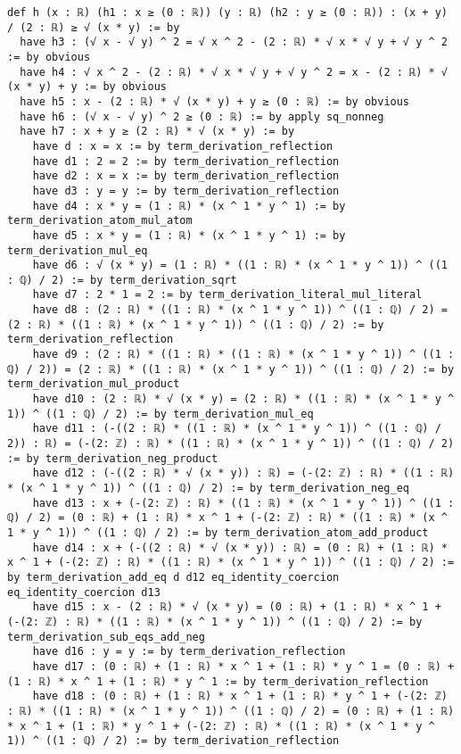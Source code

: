 \documentclass{article}
\begin{document}
\begin{tcolorbox}[colback=white!10, width=\linewidth]
\begin{lstlisting}[language=Lean4]
def h (x : ℝ) (h1 : x ≥ (0 : ℝ)) (y : ℝ) (h2 : y ≥ (0 : ℝ)) : (x + y) / (2 : ℝ) ≥ √ (x * y) := by
  have h3 : (√ x - √ y) ^ 2 = √ x ^ 2 - (2 : ℝ) * √ x * √ y + √ y ^ 2 := by obvious
  have h4 : √ x ^ 2 - (2 : ℝ) * √ x * √ y + √ y ^ 2 = x - (2 : ℝ) * √ (x * y) + y := by obvious
  have h5 : x - (2 : ℝ) * √ (x * y) + y ≥ (0 : ℝ) := by obvious
  have h6 : (√ x - √ y) ^ 2 ≥ (0 : ℝ) := by apply sq_nonneg
  have h7 : x + y ≥ (2 : ℝ) * √ (x * y) := by
    have d : x = x := by term_derivation_reflection
    have d1 : 2 = 2 := by term_derivation_reflection
    have d2 : x = x := by term_derivation_reflection
    have d3 : y = y := by term_derivation_reflection
    have d4 : x * y = (1 : ℝ) * (x ^ 1 * y ^ 1) := by term_derivation_atom_mul_atom
    have d5 : x * y = (1 : ℝ) * (x ^ 1 * y ^ 1) := by term_derivation_mul_eq
    have d6 : √ (x * y) = (1 : ℝ) * ((1 : ℝ) * (x ^ 1 * y ^ 1)) ^ ((1 : ℚ) / 2) := by term_derivation_sqrt
    have d7 : 2 * 1 = 2 := by term_derivation_literal_mul_literal
    have d8 : (2 : ℝ) * ((1 : ℝ) * (x ^ 1 * y ^ 1)) ^ ((1 : ℚ) / 2) = (2 : ℝ) * ((1 : ℝ) * (x ^ 1 * y ^ 1)) ^ ((1 : ℚ) / 2) := by term_derivation_reflection
    have d9 : (2 : ℝ) * ((1 : ℝ) * ((1 : ℝ) * (x ^ 1 * y ^ 1)) ^ ((1 : ℚ) / 2)) = (2 : ℝ) * ((1 : ℝ) * (x ^ 1 * y ^ 1)) ^ ((1 : ℚ) / 2) := by term_derivation_mul_product
    have d10 : (2 : ℝ) * √ (x * y) = (2 : ℝ) * ((1 : ℝ) * (x ^ 1 * y ^ 1)) ^ ((1 : ℚ) / 2) := by term_derivation_mul_eq
    have d11 : (-((2 : ℝ) * ((1 : ℝ) * (x ^ 1 * y ^ 1)) ^ ((1 : ℚ) / 2)) : ℝ) = (-(2: ℤ) : ℝ) * ((1 : ℝ) * (x ^ 1 * y ^ 1)) ^ ((1 : ℚ) / 2) := by term_derivation_neg_product
    have d12 : (-((2 : ℝ) * √ (x * y)) : ℝ) = (-(2: ℤ) : ℝ) * ((1 : ℝ) * (x ^ 1 * y ^ 1)) ^ ((1 : ℚ) / 2) := by term_derivation_neg_eq
    have d13 : x + (-(2: ℤ) : ℝ) * ((1 : ℝ) * (x ^ 1 * y ^ 1)) ^ ((1 : ℚ) / 2) = (0 : ℝ) + (1 : ℝ) * x ^ 1 + (-(2: ℤ) : ℝ) * ((1 : ℝ) * (x ^ 1 * y ^ 1)) ^ ((1 : ℚ) / 2) := by term_derivation_atom_add_product
    have d14 : x + (-((2 : ℝ) * √ (x * y)) : ℝ) = (0 : ℝ) + (1 : ℝ) * x ^ 1 + (-(2: ℤ) : ℝ) * ((1 : ℝ) * (x ^ 1 * y ^ 1)) ^ ((1 : ℚ) / 2) := by term_derivation_add_eq d d12 eq_identity_coercion eq_identity_coercion d13
    have d15 : x - (2 : ℝ) * √ (x * y) = (0 : ℝ) + (1 : ℝ) * x ^ 1 + (-(2: ℤ) : ℝ) * ((1 : ℝ) * (x ^ 1 * y ^ 1)) ^ ((1 : ℚ) / 2) := by term_derivation_sub_eqs_add_neg
    have d16 : y = y := by term_derivation_reflection
    have d17 : (0 : ℝ) + (1 : ℝ) * x ^ 1 + (1 : ℝ) * y ^ 1 = (0 : ℝ) + (1 : ℝ) * x ^ 1 + (1 : ℝ) * y ^ 1 := by term_derivation_reflection
    have d18 : (0 : ℝ) + (1 : ℝ) * x ^ 1 + (1 : ℝ) * y ^ 1 + (-(2: ℤ) : ℝ) * ((1 : ℝ) * (x ^ 1 * y ^ 1)) ^ ((1 : ℚ) / 2) = (0 : ℝ) + (1 : ℝ) * x ^ 1 + (1 : ℝ) * y ^ 1 + (-(2: ℤ) : ℝ) * ((1 : ℝ) * (x ^ 1 * y ^ 1)) ^ ((1 : ℚ) / 2) := by term_derivation_reflection

\end{lstlisting}
\end{tcolorbox}
\end{document}

